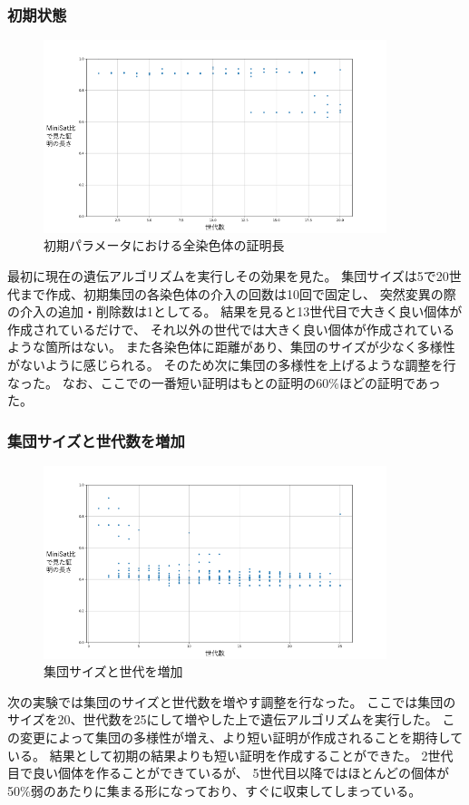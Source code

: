 \subsubsection{初期状態}
\begin{figure}[h]
    \centering
    \includegraphics[width=10cm]{figures/Experiment1/1.png}
    \caption{初期パラメータにおける全染色体の証明長}
\end{figure}
最初に現在の遺伝アルゴリズムを実行しその効果を見た。
集団サイズは5で20世代まで作成、初期集団の各染色体の介入の回数は10回で固定し、
突然変異の際の介入の追加・削除数は1としてる。
結果を見ると13世代目で大きく良い個体が作成されているだけで、
それ以外の世代では大きく良い個体が作成されているような箇所はない。
また各染色体に距離があり、集団のサイズが少なく多様性がないように感じられる。
そのため次に集団の多様性を上げるような調整を行なった。
なお、ここでの一番短い証明はもとの証明の60\%ほどの証明であった。



\subsubsection{集団サイズと世代数を増加}
\begin{figure}[h]
    \centering
    \includegraphics[width=10cm]{figures/Experiment1/2.png}
    \caption{集団サイズと世代を増加}
\end{figure}
次の実験では集団のサイズと世代数を増やす調整を行なった。
ここでは集団のサイズを20、世代数を25にして増やした上で遺伝アルゴリズムを実行した。
この変更によって集団の多様性が増え、より短い証明が作成されることを期待している。
結果として初期の結果よりも短い証明を作成することができた。
2世代目で良い個体を作ることができているが、
5世代目以降ではほとんどの個体が50\%弱のあたりに集まる形になっており、すぐに収束してしまっている。



